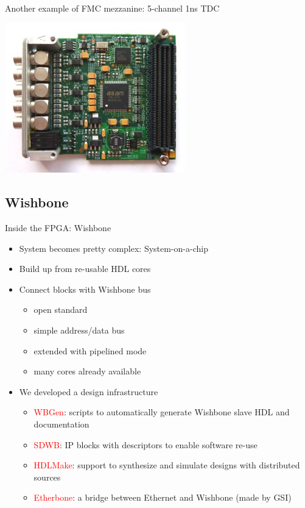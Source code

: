 \documentclass[compress,red]{beamer}
\begin{document}
\begin{frame}{Another example of FMC mezzanine: 5-channel 1ns TDC}
 \begin{center}
   \includegraphics[height=6.5cm]{FMC_TDC_72dpi_left.jpg}
 \end{center} 
\end{frame}



\subsection{Wishbone}

\begin{frame}{Inside the FPGA: Wishbone}
 \begin{itemize}
	\item System becomes pretty complex: System-on-a-chip
	\item Build up from re-usable HDL cores
	\item Connect blocks with Wishbone bus
		\begin{itemize}
		\item open standard
		\item simple address/data bus
		\item extended with pipelined mode
		\item many cores already available
		\end{itemize}
	\item We developed a design infrastructure
		\begin{itemize}
		\item \textcolor{red}{WBGen}: scripts to automatically generate Wishbone slave
                  HDL and documentation
		\item \textcolor{red}{SDWB}: IP blocks with descriptors to enable software re-use
		\item \textcolor{red}{HDLMake}: support to synthesize and simulate designs with distributed sources
		\item \textcolor{red}{Etherbone}: a bridge between Ethernet and Wishbone (made by GSI)
		\end{itemize}
 \end{itemize}
\end{frame}
\end{document}
